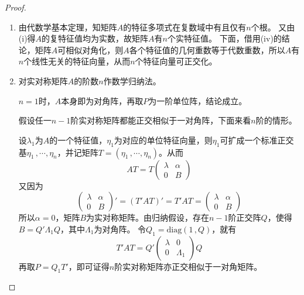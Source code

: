 \documentclass[10pt]{article}
\theoremstyle{definition}
\theoremstyle{definition}
\begin{document}
\begin{enumerate}
        \begin{proof}
            \begin{enumerate}[label=(\roman*), start=3]
                \item
                    由代数学基本定理，知矩阵$A$的特征多项式在复数域中有且仅有$n$个根。
                    又由(i)得$A$的复特征值均为实数，故矩阵$A$有$n$个实特征值。
                    下面，借用(iv)的结论，矩阵$A$可相似对角化，则$A$各个特征值的几何重数等于代数重数，所以$A$有$n$个线性无关的特征向量，从而$n$个特征向量可正交化。
                \item
                    对实对称矩阵$A$的阶数$n$作数学归纳法。

                    $n=1$时，$A$本身即为对角阵，再取$P$为一阶单位阵，结论成立。

                    假设任一$n-1$阶实对称矩阵都能正交相似于一对角阵，下面来看$n$阶的情形。

                    设$\lambda_1$为$A$的一个特征值，$\eta_1$为对应的单位特征向量，则$\eta_1$可扩成一个标准正交基$\eta_1\, ,\cdots ,\eta_n$，并记矩阵$T=(\eta_1\, ,\cdots ,\eta_n)$。从而
                    \begin{equation*}
                        AT=T
                        \begin{pmatrix}
                            \lambda & \alpha \\
                            0 & B
                        \end{pmatrix}
                    \end{equation*}
                    又因为
                    \begin{equation*}
                        \begin{pmatrix}
                            \lambda & \alpha \\
                            0 & B
                        \end{pmatrix}'=(T'AT)'=T'AT=
                        \begin{pmatrix}
                            \lambda & \alpha \\
                            0 & B
                        \end{pmatrix}
                    \end{equation*}
                    所以$\alpha = 0$，矩阵$B$为实对称矩阵。由归纳假设，存在$n-1$阶正交阵$Q$，使得$B=Q'\Lambda_1 Q$，其中$\Lambda_1$为对角阵。
                    令$Q_1=\mathrm{diag}(1\, ,Q)$，就有
                    \begin{equation*}
                        T'AT=Q'
                        \begin{pmatrix}
                            \lambda & 0 \\
                            0 & \Lambda_1
                        \end{pmatrix}Q
                    \end{equation*}
                    再取$P=Q_1T'$，即可证得$n$阶实对称矩阵亦正交相似于一对角矩阵。


\end{enumerate}
\end{proof}
\end{enumerate}
\end{document}
